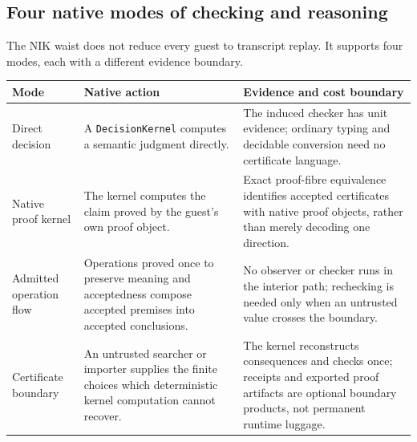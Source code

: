 \documentclass[11pt]{article}
\newcommand{\NIK}{NIK}
\newcommand{\code}[1]{\texttt{#1}}
\begin{document}
\subsection{Four native modes of checking and reasoning}

The \NIK{} waist does not reduce every guest to transcript replay.  It supports
four modes, each with a different evidence boundary.

\begin{longtable}{@{}>{\raggedright\arraybackslash}p{}
                       >{\raggedright\arraybackslash}p{}
                       >{\raggedright\arraybackslash}p{}@{}}
\toprule
\textbf{Mode} & \textbf{Native action} & \textbf{Evidence and cost boundary} \\
\midrule
Direct decision & A \code{DecisionKernel} computes a semantic judgment directly. &
The induced checker has unit evidence; ordinary typing and decidable conversion
need no certificate language. \\
Native proof kernel & The kernel computes the claim proved by the guest's own proof
object. & Exact proof-fibre equivalence identifies accepted certificates with native
proof objects, rather than merely decoding one direction. \\
Admitted operation flow & Operations proved once to preserve meaning and acceptedness
compose accepted premises into accepted conclusions. & No observer or checker runs
in the interior path; rechecking is needed only when an untrusted value crosses the
boundary. \\
Certificate boundary & An untrusted searcher or importer supplies the finite choices
which deterministic kernel computation cannot recover. & The kernel reconstructs
consequences and checks once; receipts and exported proof artifacts are optional
boundary products, not permanent runtime luggage. \\
\bottomrule
\end{longtable}
\end{document}
